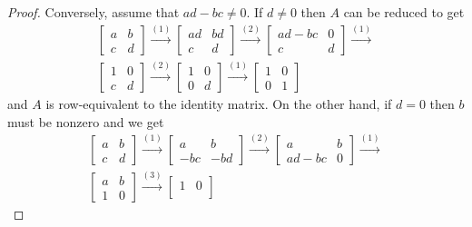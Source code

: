 \begin{proof}
  Conversely, assume that $ad - bc\neq0$. If $d\neq0$ then $A$ can be
  reduced to get
  \begin{gather*}
    \begin{bmatrix}
      a & b \\
      c & d
    \end{bmatrix}
    \xrightarrow{(1)}
    \begin{bmatrix}
      ad & bd \\
      c & d
    \end{bmatrix}
    \xrightarrow{(2)}
    \begin{bmatrix}
      ad - bc & 0 \\
      c & d
    \end{bmatrix}
    \xrightarrow{(1)} \\
    \begin{bmatrix}
      1 & 0 \\
      c & d
    \end{bmatrix}
    \xrightarrow{(2)}
    \begin{bmatrix}
      1 & 0 \\
      0 & d
    \end{bmatrix}
    \xrightarrow{(1)}
    \begin{bmatrix}
      1 & 0 \\
      0 & 1
    \end{bmatrix}
  \end{gather*}
  and $A$ is row-equivalent to the identity matrix. On the other hand,
  if $d = 0$ then $b$ must be nonzero and we get
  \begin{gather*}
    \begin{bmatrix}
      a & b \\
      c & d
    \end{bmatrix}
    \xrightarrow{(1)}
    \begin{bmatrix}
      a & b \\
      -bc & -bd
    \end{bmatrix}
    \xrightarrow{(2)}
    \begin{bmatrix}
      a & b \\
      ad-bc & 0
    \end{bmatrix}
    \xrightarrow{(1)} \\
    \begin{bmatrix}
      a & b \\
      1 & 0
    \end{bmatrix}
    \xrightarrow{(3)}
    \begin{bmatrix}
      1 & 0 \\

\end{bmatrix}
\end{gather*}
\end{proof}
